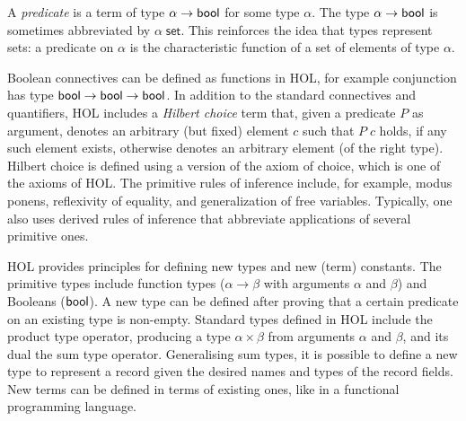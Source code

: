 \documentclass[twoside,titlepage,11pt]{article}
\begin{document}
A \emph{predicate} is a term of type $\alpha\to\mathsf{bool}$ for some type $\alpha$.
The type $\alpha\to\mathsf{bool}$ is sometimes abbreviated by $\alpha\;\mathsf{set}$.
This reinforces the idea that types represent sets: a predicate on $\alpha$ is the characteristic function of a set of elements of type $\alpha$.

Boolean connectives can be defined as functions in HOL, for example conjunction has type $\mathsf{bool}\to\mathsf{bool}\to\mathsf{bool}$.
In addition to the standard connectives and quantifiers, HOL includes a \emph{Hilbert choice} term that, given a predicate $P$ as argument, denotes an arbitrary (but fixed) element $c$ such that $P\; c$ holds, if any such element exists, otherwise denotes an arbitrary element (of the right type).
Hilbert choice is defined using a version of the axiom of choice, which is one of the axioms of HOL.
The primitive rules of inference include, for example, modus ponens, reflexivity of equality, and generalization of free variables.
Typically, one also uses derived rules of inference that abbreviate applications of several primitive ones.

HOL provides principles for defining new types and new (term) constants.
The primitive types include function types ($\alpha\to\beta$ with arguments $\alpha$ and $\beta$) and Booleans ($\mathsf{bool}$).
A new type can be defined after proving that a certain predicate on an existing type is non-empty.
Standard types defined in HOL include the product type operator, producing a type $\alpha\times\beta$ from arguments $\alpha$ and $\beta$, and its dual the sum type operator.
Generalising sum types, it is possible to define a new type to represent a record given the desired names and types of the record fields.
New terms can be defined in terms of existing ones, like in a functional programming language.
\end{document}
